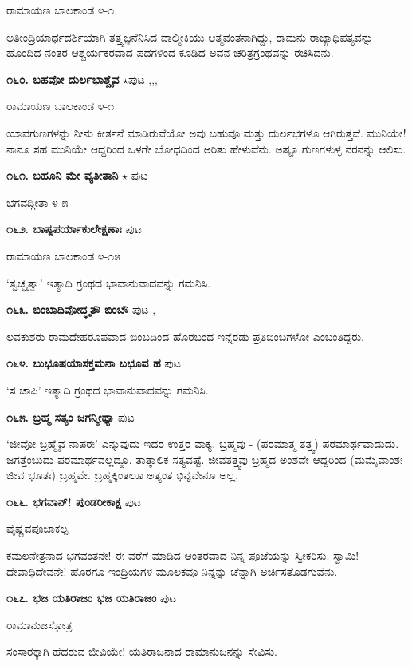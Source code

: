 \hfill ರಾಮಾಯಣ ಬಾಲಕಾಂಡ ೪-೧

ಅತೀಂದ್ರಿಯಾರ್ಥದರ್ಶಿಯಾಗಿ ತತ್ತ್ವಜ್ಞನೆನಿಸಿದ ವಾಲ್ಮೀಕಿಯು ಆತ್ಮವಂತನಾಗಿದ್ದು, ರಾಮನು ರಾಜ್ಯಾಧಿಪತ್ಯವನ್ನು ಹೊಂದಿದ ನಂತರ ಆಶ್ಚರ್ಯಕರವಾದ ಪದಗಳಿಂದ ಕೂಡಿದ ಅವನ ಚರಿತ್ರಗ್ರಂಥವನ್ನು ರಚಿಸಿದನು.

\medskip
\noindent\textbf{೧೬೦. ಬಹವೋ ದುರ್ಲಭಾಶ್ಚೈವ} $\star$\hfill ಪುಟ \pageref{163},\pageref{194},\pageref{219},\pageref{247}

\hfill ರಾಮಾಯಣ ಬಾಲಕಾಂಡ ೪-೧

ಯಾವಗುಣಗಳನ್ನು ನೀನು ಕೀರ್ತನೆ ಮಾಡಿರುವೆಯೋ ಅವು ಬಹುವೂ ಮತ್ತು ದುರ್ಲಭಗಳೂ ಆಗಿರುತ್ತವೆ. ಮುನಿಯೇ! ನಾನೂ ಸಹ ಮುನಿಯೇ ಆದ್ದರಿಂದ ಒಳಗೇ ಬೋಧದಿಂದ ಅರಿತು ಹೇಳುವೆನು. ಅಷ್ಟೂ ಗುಣಗಳುಳ್ಳ ನರನನ್ನು ಆಲಿಸು.

\medskip
\noindent\textbf{೧೬೧. ಬಹೂನಿ ಮೇ ವ್ಯತೀತಾನಿ} $\star$ \hfill ಪುಟ \pageref{91}

\hfill ಭಗವದ್ಗೀತಾ ೪-೫

\medskip
\noindent\textbf{೧೬೨. ಬಾಷ್ಪಪರ್ಯಾಕುಲೇಕ್ಷಣಾಃ} \hfill ಪುಟ \pageref{211}

\hfill ರಾಮಾಯಣ ಬಾಲಕಾಂಡ ೪-೧೫

`ತ್ವಚ್ಛೃತ್ವಾ' ಇತ್ಯಾದಿ ಗ್ರಂಥದ ಭಾವಾನುವಾದವನ್ನು ಗಮನಿಸಿ.

\medskip
\noindent\textbf{೧೬೩. ಬಿಂಬಾದಿವೋದ್ಧೃತೌ ಬಿಂಬೌ} \hfill ಪುಟ \pageref{167},\pageref{228}

ಲವಕುಶರು ರಾಮದೇಹರೂಪವಾದ ಬಿಂಬದಿಂದ ಹೊರಬಂದ ಇನ್ನೆರಡು ಪ್ರತಿಬಿಂಬಗಳೋ ಎಂಬಂತಿದ್ದರು.

\medskip
\noindent\textbf{೧೬೪. ಬುಭೂಷಯಾಸಕ್ತಮನಾ ಬಭೂವ ಹ} \hfill ಪುಟ \pageref{211}

`ಸ ಚಾಪಿ' ಇತ್ಯಾದಿ ಗ್ರಂಥದ ಭಾವಾನುವಾದವನ್ನು ಗಮನಿಸಿ.

\medskip
\noindent\textbf{೧೬೫. ಬ್ರಹ್ಮ ಸತ್ಯಂ ಜಗನ್ಮೀಥ್ಯಾ} \hfill ಪುಟ \pageref{54}

\hfill `ಜೀವೋ ಬ್ರಹ್ಮೈವ ನಾಪರಃ' ಎನ್ನುವುದು ಇದರ ಉತ್ತರ ವಾಕ್ಯ. ಬ್ರಹ್ಮವು - (ಪರಮಾತ್ಮ ತತ್ತ್ವ) ಪರಮಾರ್ಥವಾದುದು. ಜಗತ್ತೆಂಬುದು ಪರಮಾರ್ಥವಲ್ಲದ್ದೂ. ತಾತ್ಕಾಲಿಕ ಸತ್ಯವಷ್ಟೆ. ಜೀವತತ್ತ್ವವು ಬ್ರಹ್ಮದ ಅಂಶವೇ ಆದ್ದರಿಂದ (ಮಮೈವಾಂಶಃ ಜೀವ ಭೂತಃ) ಬ್ರಹ್ಮವೇ. ಬ್ರಹ್ಮಕ್ಕಿಂತಲೂ ಅತ್ಯಂತ ಭಿನ್ನವೇನೂ ಅಲ್ಲ.

\medskip
\noindent\textbf{೧೬೬. ಭಗವಾನ್! ಪುಂಡರೀಕಾಕ್ಷ} \hfill ಪುಟ \pageref{115}

\hfill ವೈಷ್ಣವಪೂಜಾಕಲ್ಪ

ಕಮಲನೇತ್ರನಾದ ಭಗವಂತನೇ! ಈ ವರೆಗೆ ಮಾಡಿದ ಆಂತರವಾದ ನಿನ್ನ ಪೂಜೆಯನ್ನು ಸ್ವೀಕರಿಸು. ಸ್ವಾಮಿ! ದೇವಾಧಿದೇವನೇ! ಹೊರಗೂ ಇಂದ್ರಿಯಗಳ ಮೂಲಕವೂ ನಿನ್ನನ್ನು ಚೆನ್ನಾಗಿ ಅರ್ಚಿಸತೊಡಗುವೆನು.

\medskip
\noindent\textbf{೧೬೭. ಭಜ ಯತಿರಾಜಂ ಭಜ ಯತಿರಾಜಂ} \hfill ಪುಟ \pageref{46}

\hfill ರಾಮಾನುಜಸ್ತೋತ್ರ

ಸಂಸಾರಕ್ಕಾಗಿ ಹೆದರುವ ಜೀವಿಯೇ! ಯತಿರಾಜನಾದ ರಾಮಾನುಜನನ್ನು ಸೇವಿಸು.

